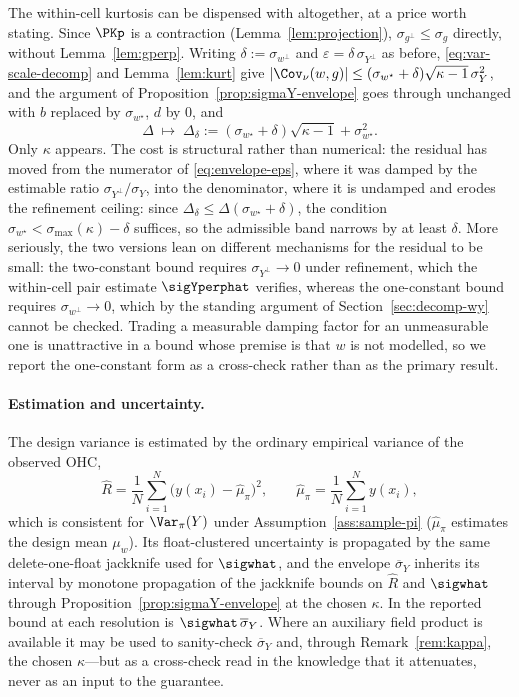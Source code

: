 \begin{remark}
\label{rem:one-constant}
The within-cell kurtosis can be dispensed with altogether, at a price
worth stating. Since $\PKp$ is a contraction
(Lemma~\ref{lem:projection}), $\sigma_{g^{\perp}}\le\sigma_g$ directly,
without Lemma~\ref{lem:gperp}. Writing $\delta:=\sigma_{w^{\perp}}$ and
$\varepsilon=\delta\,\sigma_{Y^{\perp}}$ as before,
\eqref{eq:var-scale-decomp} and Lemma~\ref{lem:kurt} give
$|\Cov_\nu(w,g)|\le(\sigma_{w^{\star}}+\delta)\sqrt{\kappa-1}\,\sigma_Y^2$,
and the argument of Proposition~\ref{prop:sigmaY-envelope} goes through
unchanged with $b$ replaced by $\sigma_{w^{\star}}$, $d$ by $0$, and
\[
  \Delta\;\longmapsto\;
  \Delta_\delta:=(\sigma_{w^{\star}}+\delta)\sqrt{\kappa-1}
    +\sigma_{w^{\star}}^2 .
\]
Only $\kappa$ appears. The cost is structural rather than numerical: the
residual has moved from the numerator of \eqref{eq:envelope-eps}, where
it was damped by the estimable ratio
$\sigma_{Y^{\perp}}/\sigma_Y$, into the denominator, where it is
undamped and erodes the refinement ceiling: since
$\Delta_\delta\le\Delta(\sigma_{w^{\star}}+\delta)$, the condition
$\sigma_{w^{\star}}<\sigma_{\max}(\kappa)-\delta$ suffices, so the
admissible band narrows by at least $\delta$. More seriously, the two versions lean on
different mechanisms for the residual to be small: the two-constant bound
requires $\sigma_{Y^{\perp}}\to0$ under refinement, which the within-cell
pair estimate $\sigYperphat$ verifies, whereas the one-constant bound
requires $\sigma_{w^{\perp}}\to0$, which by the standing argument of
Section~\ref{sec:decomp-wy} cannot be checked. Trading a measurable
damping factor for an unmeasurable one is unattractive in a bound whose
premise is that $w$ is not modelled, so we report the one-constant form
as a cross-check rather than as the primary result.
\end{remark}

\paragraph{Estimation and uncertainty.} The design variance is estimated
by the ordinary empirical variance of the observed OHC,
\[
  \hat R=\frac1N\sum_{i=1}^{N}\big(y(x_i)-\hat\mu_\pi\big)^2 ,
  \qquad
  \hat\mu_\pi=\frac1N\sum_{i=1}^{N}y(x_i),
\]
which is consistent for $\Var_\pi(Y)$ under
Assumption~\ref{ass:sample-pi} ($\hat\mu_\pi$ estimates the design mean
$\mu_w$). Its float-clustered uncertainty is propagated by the same
delete-one-float jackknife used for $\sigwhat$, and the envelope
$\overline{\sigma}_Y$ inherits its interval by monotone propagation of
the jackknife bounds on $\hat R$ and $\sigwhat$ through
Proposition~\ref{prop:sigmaY-envelope} at the chosen $\kappa$. In the
reported bound at each resolution is
$\sigwhat\,\overline{\sigma}_Y$. Where an auxiliary field product is
available it may be used to sanity-check $\overline{\sigma}_Y$ and,
through Remark~\ref{rem:kappa}, the chosen $\kappa$---but as a
cross-check read in the knowledge that it attenuates, never as an input
to the guarantee.

